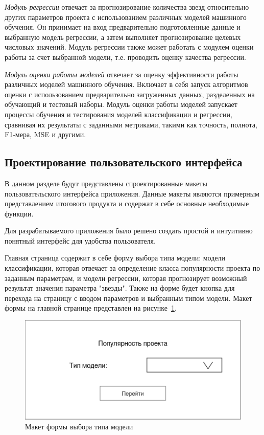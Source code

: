 \textit{Модуль регрессии} отвечает за прогнозирование количества звезд относительно других параметров проекта с использованием различных моделей машинного обучения. Он принимает на вход предварительно подготовленные данные и выбранную модель регрессии, а затем выполняет прогнозирование целевых числовых значений. Модуль регрессии также может работать с модулем оценки работы за счет выбранной модели, т.е. проводить оценку качества регрессии.

\textit{Модуль оценки работы моделей} отвечает за оценку эффективности работы различных моделей машинного обучения. Включает в себя запуск алгоритмов оценки с использованием предварительно загруженных данных, разделенных на обучающий и тестовый наборы. Модуль оценки работы моделей запускает процессы обучения и тестирования моделей классификации и регрессии, сравнивая их результаты с заданными метриками, такими как точность, полнота, F1-мера, MSE и другими. 

\subsection{Проектирование пользовательского интерфейса}
\label{sec:Graphical-interface}

В данном разделе будут представлены спроектированные макеты пользовательского интерфейса приложения. Данные макеты являются примерным представлением итогового продукта и содержат в себе основные необходимые функции.

Для разрабатываемого приложения было решено создать простой и интуитивно понятный интерфейс для удобства пользователя.

Главная страница содержит в себе форму выбора типа модели: модели классификации, которая отвечает за определение класса популярности проекта по заданным параметрам, и модели регрессии, которая прогнозирует возможный результат значения параметра "звезды". Также на форме будет кнопка для перехода на страницу с вводом параметров и выбранным типом модели. Макет формы на главной странице представлен на рисунке~\ref{ris:main-form}.

\begin{figure}[h]
    \centering
    \includegraphics[width=0.7\linewidth]{pic/main-form.png}
    \vspace{0.5em}\caption{Макет формы выбора типа модели}
    \label{ris:main-form}
\end{figure}
\vspace{1em}

